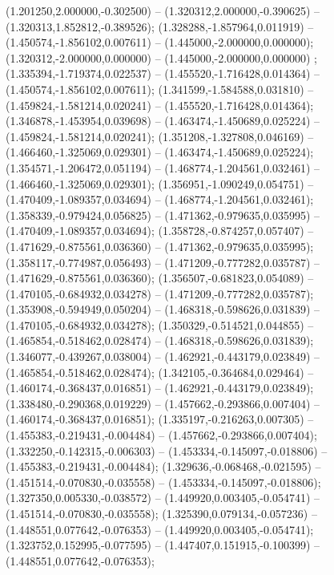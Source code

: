  (1.201250,2.000000,-0.302500) -- (1.320312,2.000000,-0.390625) -- (1.320313,1.852812,-0.389526);
 (1.328288,-1.857964,0.011919) -- (1.450574,-1.856102,0.007611) -- (1.445000,-2.000000,0.000000);
 (1.320312,-2.000000,0.000000) -- (1.445000,-2.000000,0.000000) ;
 (1.335394,-1.719374,0.022537) -- (1.455520,-1.716428,0.014364) -- (1.450574,-1.856102,0.007611);
 (1.341599,-1.584588,0.031810) -- (1.459824,-1.581214,0.020241) -- (1.455520,-1.716428,0.014364);
 (1.346878,-1.453954,0.039698) -- (1.463474,-1.450689,0.025224) -- (1.459824,-1.581214,0.020241);
 (1.351208,-1.327808,0.046169) -- (1.466460,-1.325069,0.029301) -- (1.463474,-1.450689,0.025224);
 (1.354571,-1.206472,0.051194) -- (1.468774,-1.204561,0.032461) -- (1.466460,-1.325069,0.029301);
 (1.356951,-1.090249,0.054751) -- (1.470409,-1.089357,0.034694) -- (1.468774,-1.204561,0.032461);
 (1.358339,-0.979424,0.056825) -- (1.471362,-0.979635,0.035995) -- (1.470409,-1.089357,0.034694);
 (1.358728,-0.874257,0.057407) -- (1.471629,-0.875561,0.036360) -- (1.471362,-0.979635,0.035995);
 (1.358117,-0.774987,0.056493) -- (1.471209,-0.777282,0.035787) -- (1.471629,-0.875561,0.036360);
 (1.356507,-0.681823,0.054089) -- (1.470105,-0.684932,0.034278) -- (1.471209,-0.777282,0.035787);
 (1.353908,-0.594949,0.050204) -- (1.468318,-0.598626,0.031839) -- (1.470105,-0.684932,0.034278);
 (1.350329,-0.514521,0.044855) -- (1.465854,-0.518462,0.028474) -- (1.468318,-0.598626,0.031839);
 (1.346077,-0.439267,0.038004) -- (1.462921,-0.443179,0.023849) -- (1.465854,-0.518462,0.028474);
 (1.342105,-0.364684,0.029464) -- (1.460174,-0.368437,0.016851) -- (1.462921,-0.443179,0.023849);
 (1.338480,-0.290368,0.019229) -- (1.457662,-0.293866,0.007404) -- (1.460174,-0.368437,0.016851);
 (1.335197,-0.216263,0.007305) -- (1.455383,-0.219431,-0.004484) -- (1.457662,-0.293866,0.007404);
 (1.332250,-0.142315,-0.006303) -- (1.453334,-0.145097,-0.018806) -- (1.455383,-0.219431,-0.004484);
 (1.329636,-0.068468,-0.021595) -- (1.451514,-0.070830,-0.035558) -- (1.453334,-0.145097,-0.018806);
 (1.327350,0.005330,-0.038572) -- (1.449920,0.003405,-0.054741) -- (1.451514,-0.070830,-0.035558);
 (1.325390,0.079134,-0.057236) -- (1.448551,0.077642,-0.076353) -- (1.449920,0.003405,-0.054741);
 (1.323752,0.152995,-0.077595) -- (1.447407,0.151915,-0.100399) -- (1.448551,0.077642,-0.076353);
